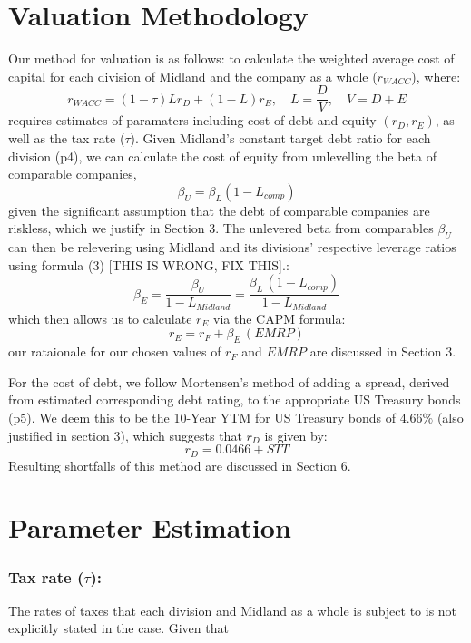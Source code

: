 \documentclass{article}
\begin{document}
\section{Valuation Methodology}
Our method for valuation is as follows: to calculate the weighted average cost of capital for each division of Midland and the company as a whole ($r_{W\!ACC}$), where:
\begin{equation}
    r_{W\!ACC} = (1 - \tau)Lr_{D} + (1-L)r_E, \quad L=\frac{D}{V}, \quad V=D+E
\end{equation}
requires estimates of paramaters including cost of debt and equity $(r_{D},r_{E})$, as well as the tax rate ($\tau$). Given Midland's constant target debt ratio for each division (p4), we can calculate the cost of equity from unlevelling the beta of comparable companies, 
\begin{equation}
    \beta_U=\beta_L(1-L_{comp})
\end{equation}
given the significant assumption that the debt of comparable companies are riskless, which we justify in Section 3. The unlevered beta from comparables $\beta_U$ can then be relevering using Midland and its divisions' respective leverage ratios using formula (3) [THIS IS WRONG, FIX THIS].:
\begin{equation}
    \beta_E=\frac{\beta_U}{1-L_{Midland}}=\frac{\beta_L\,(1-L_{comp})}{1-L_{Midland}}
\end{equation} which then allows us to calculate $r_E$ via the CAPM formula:
\begin{equation}
    r_E=r_F+\beta_E\,(EMRP)
\end{equation}
our rataionale for our chosen values of $r_F$ and $EMRP$ are discussed in Section 3.

For the cost of debt, we follow Mortensen's method of adding a spread, derived from estimated corresponding debt rating, to the appropriate US Treasury bonds (p5). We deem this to be the 10-Year YTM for US Treasury bonds of $4.66\%$ (also justified in section 3), which suggests that $r_D$ is given by:
\begin{equation}
    r_D=0.0466+STT
\end{equation}
Resulting shortfalls of this method are discussed in Section 6.

\pagebreak
\hrulefill
\section{Parameter Estimation}
\subsubsection*{Tax rate ($\tau$):}The rates of taxes that each division and Midland as a whole is subject to is not explicitly stated in the case. Given that 
\end{document}
